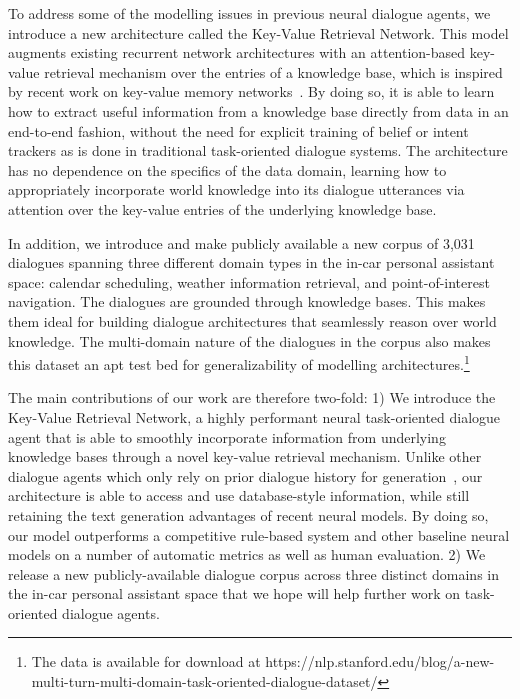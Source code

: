 \documentclass[11pt,a4paper]{article}
\begin{document}
  To address some of the modelling issues in previous neural dialogue agents, we introduce a new architecture called the Key-Value Retrieval Network. This model augments existing recurrent network architectures with an attention-based key-value retrieval mechanism over the entries of a knowledge base, which is inspired by recent work on key-value memory networks~\cite{miller-EtAl:2016:EMNLP2016}. By doing so, it is able to learn how to extract useful information from a knowledge base directly from data in an end-to-end fashion, without the need for explicit training of belief or intent trackers as is done in traditional task-oriented dialogue systems. The architecture has no dependence on the specifics of the data domain, learning how to appropriately incorporate world knowledge into its dialogue utterances via attention over the key-value entries of the underlying knowledge base.

  In addition, we introduce and make publicly available a new corpus of 3,031 dialogues spanning three different domain types in the in-car personal assistant space: calendar scheduling, weather information retrieval, and point-of-interest navigation. The dialogues are grounded through knowledge bases. This makes them ideal for building dialogue architectures that seamlessly reason over world knowledge. The multi-domain nature of the dialogues in the corpus also makes this dataset an apt test bed for generalizability of modelling architectures.\footnote{The data is available for download at https://nlp.stanford.edu/blog/a-new-multi-turn-multi-domain-task-oriented-dialogue-dataset/}

  The main contributions of our work are therefore two-fold: 1) We introduce the Key-Value Retrieval Network, a highly performant neural task-oriented dialogue agent that is able to smoothly incorporate information from underlying knowledge bases through a novel key-value retrieval mechanism. Unlike other dialogue agents which only rely on prior dialogue history for generation~\cite{45189,E17-2075}, our architecture is able to access and use database-style information, while still retaining the text generation advantages of recent neural models. By doing so, our model outperforms a competitive rule-based system and other baseline neural models on a number of automatic metrics as well as human evaluation. 2) We release a new publicly-available dialogue corpus across three distinct domains in the in-car personal assistant space that we hope will help further work on task-oriented dialogue agents.
\end{document}
